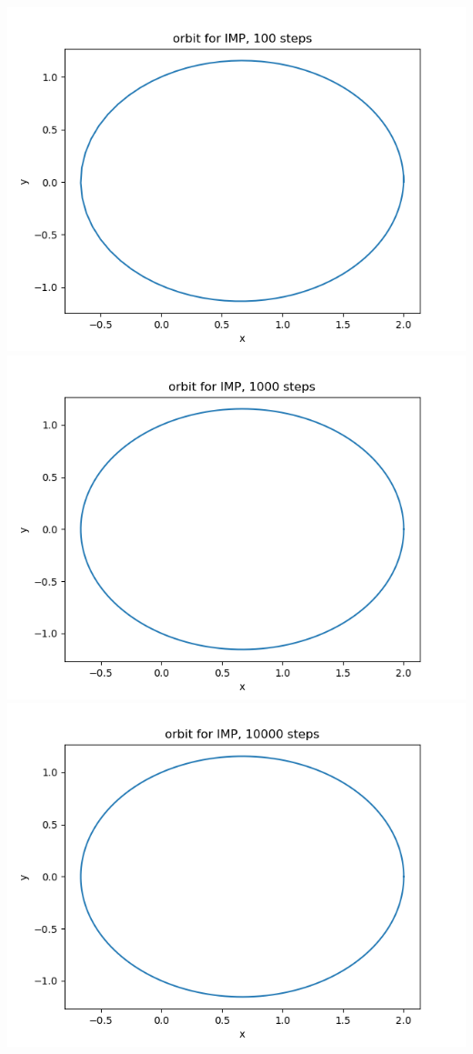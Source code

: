 \documentclass{article}
\begin{document}
\begin{enumerate}[label=(\alph*)]
\begin{center}
	\includegraphics[scale=.3]{hw5 IMP orbit 100 steps}
	\includegraphics[scale=.3]{hw5 IMP orbit 1000 steps}
	\includegraphics[scale=.3]{hw5 IMP orbit 10000 steps}

\end{center}
\end{enumerate}
\end{document}
